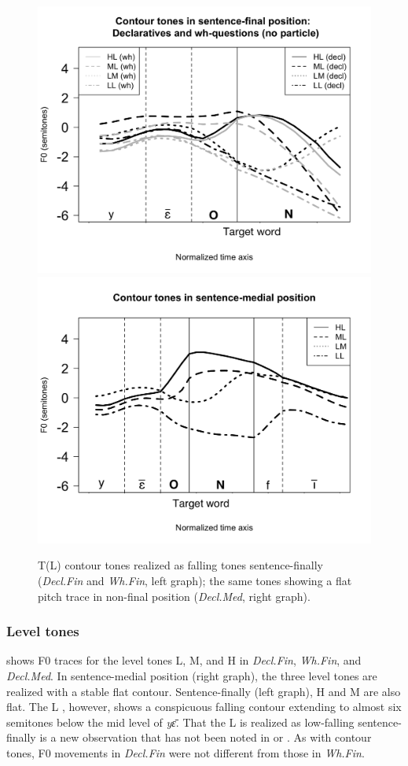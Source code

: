 \documentclass[output=paper,newtxmath,modfonts,nonflat,hidelinks]{langsci/langscibook}
\begin{document}
\begin{figure}
\begin{center}
\caption{T(L) contour tones realized as falling tones sentence-finally (\textit{Decl.Fin} and \textit{Wh.Fin}, left graph); the same tones showing a flat pitch trace in non-final position (\textit{Decl.Med}, right graph).}
\label{fig:gjersoe:level-contour}
\includegraphics[width=0.45\linewidth]{figures/Contour-Decl-Wh2-AllSpeak-MinBirdplus_rep_father_basket-NewP_p.png}
\includegraphics[width=0.45\linewidth]{figures/Contour-con-AllSpeak-MinBirdplus_rep_father_basket_p.png}
\end{center}
\end{figure}

\subsubsection{Level tones}\label{sec:gjersoe:2.2.2}

 shows F0 traces for the level tones L, M, and H in \textit{Decl.Fin}, \textit{Wh.Fin}, and \textit{Decl.Med}.
In sentence-medial position (right graph), the three level tones are realized with a stable flat contour.
Sentence-finally (left graph), H and M are also flat.
The L , however, shows a conspicuous falling contour extending to almost six semitones below the mid level of \textit{y{\=ɛ}}.
That the L  is realized as low-falling sentence-finally is a new observation that has not been noted in \citet{Fiore.1987} or \citet{Fransen.1995}.
As with contour tones, F0 movements in \textit{Decl.Fin} were not different from those in \textit{Wh.Fin}.
\end{document}

